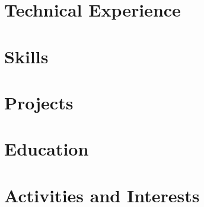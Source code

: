 \documentclass[letter,10pt]{article}
\begin{document}
% 

\section{Technical Experience}


\section{Skills}



\section{Projects}


\section{Education}


\section{Activities and Interests}

\end{document}
